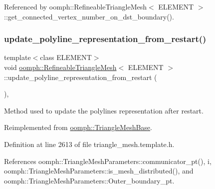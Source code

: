 Referenced by oomph\+::\+Refineable\+Triangle\+Mesh$<$ E\+L\+E\+M\+E\+N\+T $>$\+::get\+\_\+connected\+\_\+vertex\+\_\+number\+\_\+on\+\_\+dst\+\_\+boundary().

\mbox{\label{classoomph_1_1RefineableTriangleMesh_a26cdfda4b77158dd24641cb5889ad2ff}} 
\subsubsection{\texorpdfstring{update\+\_\+polyline\+\_\+representation\+\_\+from\+\_\+restart()}{update\_polyline\_representation\_from\_restart()}}
{\footnotesize\ttfamily template$<$class E\+L\+E\+M\+E\+NT$>$ \\
void \hyperlink{classoomph_1_1RefineableTriangleMesh}{oomph\+::\+Refineable\+Triangle\+Mesh}$<$ E\+L\+E\+M\+E\+NT $>$\+::update\+\_\+polyline\+\_\+representation\+\_\+from\+\_\+restart (\begin{DoxyParamCaption}{ }\end{DoxyParamCaption})\hspace{0.3cm}{\ttfamily [inline]}, {\ttfamily [virtual]}}



Method used to update the polylines representation after restart. 



Reimplemented from \hyperlink{classoomph_1_1TriangleMeshBase_ae822f78ce56d1ff9a3c06d7ec8bc2563}{oomph\+::\+Triangle\+Mesh\+Base}.



Definition at line 2613 of file triangle\+\_\+mesh.\+template.\+h.



References oomph\+::\+Triangle\+Mesh\+Parameters\+::communicator\+\_\+pt(), i, oomph\+::\+Triangle\+Mesh\+Parameters\+::is\+\_\+mesh\+\_\+distributed(), and oomph\+::\+Triangle\+Mesh\+Parameters\+::\+Outer\+\_\+boundary\+\_\+pt.

\mbox{\label{classoomph_1_1RefineableTriangleMesh_a42bd18f8738951f58bf755085ebb71c2}} 
